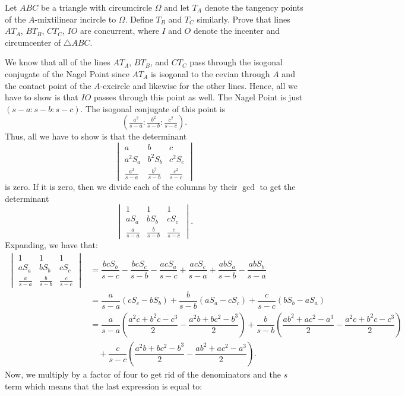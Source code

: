 \documentclass{article}
\begin{document}
\begin{problem}[7.42]{}
Let $ABC$ be a triangle with circumcircle $\Omega$ and let $T_A$ denote the tangency points of the $A$-mixtilinear incircle to $\Omega$. Define $T_B$ and $T_C$ similarly. Prove that lines $AT_A$, $BT_B$, $CT_C$, $IO$ are concurrent, where $I$ and $O$ denote the incenter and circumcenter of $\triangle ABC$. 
\end{problem}
We know that all of the lines $AT_A$, $BT_B$, and $CT_C$ pass through the isogonal conjugate of the Nagel Point since $AT_A$ is isogonal to the cevian through $A$ and the contact point of the $A$-excircle and likewise for the other lines. Hence, all we have to show is that $IO$ passes through this point as well. The Nagel Point is just $\left(s-a : s-b : s-c\right)$. The isogonal conjugate of this point is \[\left(\tfrac{a^2}{s-a} : \tfrac{b^2}{s-b} : \tfrac{c^2}{s-c}\right).\] Thus, all we have to show is that the determinant \[\begin{vmatrix}a&b&c\\a^2S_a&b^2S_b&c^2S_c\\\tfrac{a^2}{s-a}&\tfrac{b^2}{s-b}&\tfrac{c^2}{s-c}\end{vmatrix}\] is zero. If it is zero, then we divide each of the columns by their $\gcd$ to get the determinant \[\begin{vmatrix}1&1&1\\aS_a&bS_b&cS_c\\\tfrac{a}{s-a}&\tfrac{b}{s-b}&\tfrac{c}{s-c}\end{vmatrix}.\] Expanding, we have that:
\begin{align*}
\begin{vmatrix}1&1&1\\aS_a&bS_b&cS_c\\\tfrac{a}{s-a}&\tfrac{b}{s-b}&\tfrac{c}{s-c}\end{vmatrix} &= \dfrac{bcS_b}{s-c}-\dfrac{bcS_c}{s-b}-\dfrac{acS_a}{s-c}+\dfrac{acS_c}{s-a}+\dfrac{abS_a}{s-b}-\dfrac{abS_b}{s-a} \\
&= \dfrac{a}{s-a}(cS_c-bS_b)+\dfrac{b}{s-b}(aS_a-cS_c)+\dfrac{c}{s-c}(bS_b-aS_a) \\
&= \dfrac{a}{s-a}\left(\dfrac{a^2c+b^2c-c^3}{2}-\dfrac{a^2b+bc^2-b^3}{2}\right)+\dfrac{b}{s-b}\left(\dfrac{ab^2+ac^2-a^3}{2}-\dfrac{a^2c+b^2c-c^3}{2}\right) \\
&\quad+\dfrac{c}{s-c}\left(\dfrac{a^2b+bc^2-b^3}{2}-\dfrac{ab^2+ac^2-a^3}{2}\right).
\end{align*}
Now, we multiply by a factor of four to get rid of the denominators and the $s$ term which means that the last expression is equal to:
\end{document}
